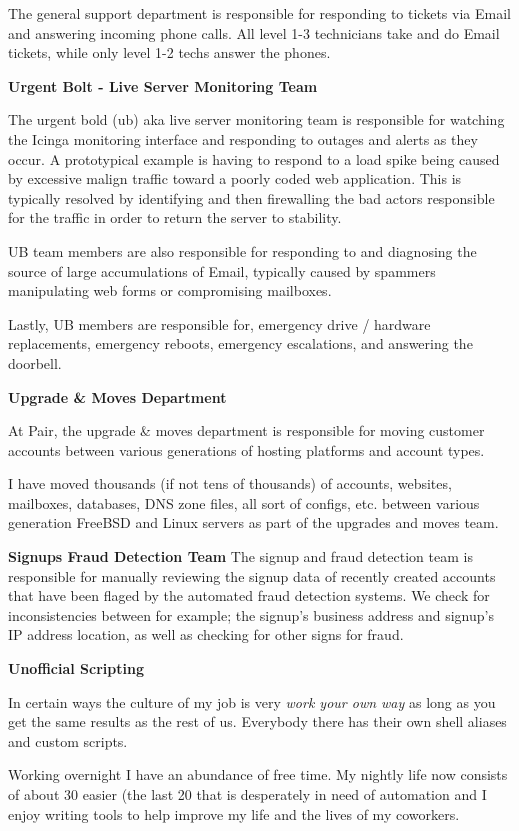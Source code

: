 \documentclass{article}
\begin{document}
The general support department is responsible for responding to tickets via
Email and answering incoming phone calls. All level 1-3 technicians take and do
Email tickets, while only level 1-2 techs answer the phones. 

\textbf{Urgent Bolt - Live Server Monitoring Team}

The urgent bold (ub) aka live server monitoring team is responsible for
watching the Icinga monitoring interface and responding to outages and alerts
as they occur. A prototypical example is having to respond to a load spike
being caused by excessive malign traffic toward a poorly coded web application.
This is typically resolved by identifying and then firewalling the bad actors
responsible for the traffic in order to return the server to stability.

UB team members are also responsible for responding to and diagnosing the
source of large accumulations of Email, typically caused by spammers
manipulating web forms or compromising mailboxes.

Lastly, UB members are responsible for, emergency drive / hardware
replacements, emergency reboots, emergency escalations, and answering the
doorbell.

\textbf{Upgrade \& Moves Department}

At Pair, the upgrade \& moves department is responsible for moving customer
accounts between various generations of hosting platforms and account types.

I have moved thousands (if not tens of thousands) of accounts, websites,
mailboxes, databases, DNS zone files, all sort of configs, etc. between various
generation FreeBSD and Linux servers as part of the upgrades and moves team.

\textbf{Signups Fraud Detection Team}
The signup and fraud detection team is responsible for manually reviewing the
signup data of recently created accounts that have been flaged by the automated
fraud detection systems. We check for inconsistencies between for example; the
signup's business address and signup's IP address location, as well as checking
for other signs for fraud.

\textbf{Unofficial Scripting}

In certain ways the culture of my job is very \emph{work your own way} as long
as you get the same results as the rest of us. Everybody there has their own
shell aliases and custom scripts.

Working overnight I have an abundance of free time. My nightly life now
consists of about 30%
easier (the last 20%
that is desperately in need of automation and I enjoy writing tools to help
improve my life and the lives of my coworkers.
\end{document}

